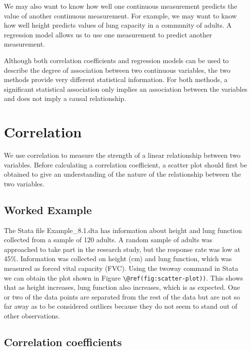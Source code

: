 \documentclass[
]{memoir}
\begin{document}
We may also want to know how well one continuous measurement predicts the value of another continuous measurement. For example, we may want to know how well height predicts values of lung capacity in a community of adults. A regression model allows us to use one measurement to predict another measurement.

Although both correlation coefficients and regression models can be used to describe the degree of association between two continuous variables, the two methods provide very different statistical information. For both methods, a significant statistical association only implies an association between the variables and does not imply a causal relationship.

\hypertarget{correlation}{%
\section{Correlation}\label{correlation}}

We use correlation to measure the strength of a linear relationship between two variables. Before calculating a correlation coefficient, a scatter plot should first be obtained to give an understanding of the nature of the relationship between the two variables.

\hypertarget{worked-example-4}{%
\subsection{Worked Example}\label{worked-example-4}}

The Stata file Example\_8.1.dta has information about height and lung function collected from a sample of 120 adults. A random sample of adults was approached to take part in the research study, but the response rate was low at 45\%. Information was collected on height (cm) and lung function, which was measured as forced vital capacity (FVC). Using the twoway command in Stata we can obtain the plot shown in Figure \texttt{\textbackslash{}@ref(fig:scatter-plot))}. This shows that as height increases, lung function also increases, which is as expected. One or two of the data points are separated from the rest of the data but are not so far away as to be considered outliers because they do not seem to stand out of other observations.

\hypertarget{correlation-coefficients}{%
\subsection{Correlation coefficients}\label{correlation-coefficients}}
\end{document}
